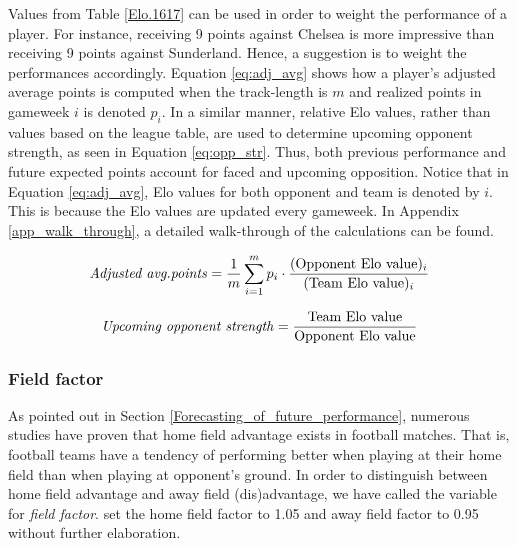 Values from Table \ref{Elo.1617} can be used in order to weight the performance of a player. For instance, receiving 9 points against Chelsea is more impressive than receiving 9 points against Sunderland. Hence, a suggestion is to weight the performances accordingly. Equation \ref{eq:adj_avg} shows how a player's adjusted average points is computed when the track-length is $m$ and realized points in gameweek $i$ is denoted $p_i$. In a similar manner, relative Elo values, rather than values based on the league table, are used to determine upcoming opponent strength, as seen in Equation \ref{eq:opp_str}. Thus, both previous performance and future expected points account for faced and upcoming opposition. Notice that in Equation \ref{eq:adj_avg}, Elo values for both opponent and team is denoted by $i$. This is because the Elo values are updated every gameweek. In Appendix \ref{app_walk_through}, a detailed walk-through of the calculations can be found.

\begin{equation}
\textrm{\textit{Adjusted avg.points}} = \frac{1}{m}\sum_{i=1}^m p_i \cdot \frac{(\mathrm{Opponent \ Elo \ value})_i}{(\mathrm{Team \ Elo \ value})_i}
\label{eq:adj_avg}
\end{equation}

\begin{equation}
\textrm{\textit{Upcoming opponent strength}} = \frac{\textrm{Team Elo value}}{\textrm{Opponent Elo value}}
\label{eq:opp_str}
\end{equation}

\subsubsection{Field factor}
As pointed out in Section \ref{Forecasting_of_future_performance}, numerous studies have proven that home field advantage exists in football matches. That is, football teams have a tendency of performing better when playing at their home field than when playing at opponent's ground. In order to distinguish between home field advantage and away field (dis)advantage, we have called the variable for \textit{field factor}. \cite{Bonomo} set the home field factor to 1.05 and away field factor to 0.95 without further elaboration. 

